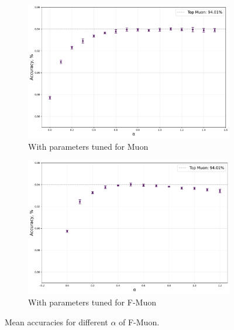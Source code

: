 \documentclass{article} %
\begin{document}
    \begin{figure}[h!]
        \centering
        \begin{subfigure}[b]{0.48\linewidth}
            \centering
            \includegraphics[width=\linewidth]{figs/muon_tuned_diff_alpha.pdf}
            \caption{With parameters tuned for Muon}
            \label{fig:muon_alphas}
        \end{subfigure}
        \hfill
        \begin{subfigure}[b]{0.48\linewidth}
            \centering
            \includegraphics[width=\linewidth]{figs/fmuon_tuned_diff_alpha.pdf}
            \caption{With parameters tuned for F-Muon}
            \label{fig:fmuon_alphas}
        \end{subfigure}
        \caption{Mean accuracies for different $\alpha$ of F-Muon.}
        \label{fig:diff_alphas}
    \end{figure}   
\end{document}

